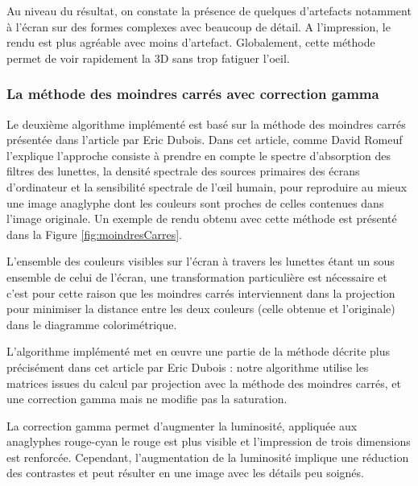 
	Au niveau du résultat, on constate la présence de quelques d'artefacts notamment à l'écran sur des formes complexes avec beaucoup de détail. A l'impression, le rendu est plus agréable avec moins d'artefact. Globalement, cette méthode permet de voir rapidement la 3D sans trop fatiguer l'oeil.
\subsubsection{La méthode des moindres carrés avec correction gamma}
	Le deuxième algorithme implémenté est basé sur la méthode des moindres carrés présentée dans l'article \cite{algoDubois} par Eric Dubois. Dans cet article, comme David Romeuf l'explique \cite{explicationAlgoDubois} l'approche consiste à prendre en compte le spectre d'absorption des filtres des lunettes, la densité spectrale des sources primaires des écrans d'ordinateur et la sensibilité spectrale de l'œil humain, pour reproduire au mieux une image anaglyphe dont les couleurs sont proches de celles contenues dans l'image originale. Un exemple de rendu obtenu avec cette méthode est présenté dans la Figure \ref{fig:moindresCarres}.
	
	L'ensemble des couleurs visibles sur l'écran à travers les lunettes étant un sous ensemble de celui de l'écran, une transformation particulière est nécessaire et c'est pour cette raison que les moindres carrés interviennent dans la projection pour minimiser la distance entre les deux couleurs (celle obtenue et l'originale) dans le diagramme colorimétrique.
	
	L'algorithme implémenté met en \oe uvre une partie de la méthode décrite plus précisément dans cet article par Eric Dubois \cite{algoMoindreCarres} : notre algorithme utilise les matrices issues du calcul par projection avec la méthode des moindres carrés, et une correction gamma mais ne modifie pas la saturation.
	
	La correction gamma permet d'augmenter la luminosité, appliquée aux anaglyphes rouge-cyan le rouge est plus visible et l'impression de trois dimensions est renforcée. Cependant, l'augmentation de la luminosité implique une réduction des contrastes et peut résulter en une image avec les détails peu soignés.

